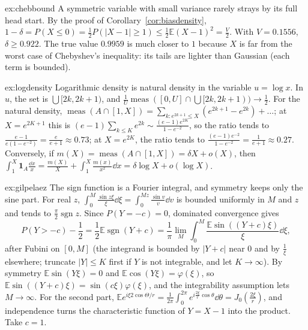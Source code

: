 \begin{solution}{ex:chebbound}
\idea A symmetric variable with small variance rarely strays by its full head start.
\writeup By the proof of Corollary~\ref{cor:biasdensity}, $1-\delta=P(X\le0)=\frac12P(|X-1|\ge1)\le\frac12\mathbb E(X-1)^2=\frac V2$. With $V=0.1556$, $\delta\ge0.922$. The true value $0.9959$ is much closer to $1$ because $X$ is far from the worst case of Chebyshev's inequality: its tails are lighter than Gaussian (each term is bounded).
\end{solution}

\begin{solution}{ex:logdensity}
\idea Logarithmic density is natural density in the variable $u=\log x$.
\writeup In $u$, the set is $\bigcup[2k,2k+1)$, and $\frac1U\operatorname{meas}([0,U]\cap\bigcup[2k,2k+1))\to\frac12$. For the natural density, $\operatorname{meas}(A\cap[1,X])=\sum_{k:e^{2k+1}\le X}(e^{2k+1}-e^{2k})+\dots$; at $X=e^{2K+1}$ this is $(e-1)\sum_{k\le K}e^{2k}\sim\frac{(e-1)e^{2K}}{1-e^{-2}}$, so the ratio tends to $\frac{e-1}{e(1-e^{-2})}=\frac e{e+1}\approx0.73$; at $X=e^{2K}$, the ratio tends to $\frac{(e-1)e^{-2}}{1-e^{-2}}=\frac1{e+1}\approx0.27$. Conversely, if $m(X)=\operatorname{meas}(A\cap[1,X])=\delta X+o(X)$, then $\int_1^X\mathbf 1_A\frac{\dd x}x=\frac{m(X)}X+\int_1^X\frac{m(x)}{x^2}\dd x=\delta\log X+o(\log X)$.
\end{solution}

\begin{solution}{ex:gilpelaez}
\idea The sign function is a Fourier integral, and symmetry keeps only the sine part.
\writeup For real $z$, $\int_0^M\frac{\sin z\xi}\xi\dd\xi=\int_0^{Mz}\frac{\sin v}v\dd v$ is bounded uniformly in $M$ and $z$ and tends to $\frac\pi2\operatorname{sgn}z$. Since $P(Y=-c)=0$, dominated convergence gives
\[
P(Y>-c)-\frac12=\frac12\mathbb E\operatorname{sgn}(Y+c)=\frac1\pi\lim_M\int_0^M\frac{\mathbb E\sin((Y+c)\xi)}\xi\dd\xi,
\]
after Fubini on $[0,M]$ (the integrand is bounded by $|Y+c|$ near $0$ and by $\frac1\xi$ elsewhere; truncate $|Y|\le K$ first if $Y$ is not integrable, and let $K\to\infty$). By symmetry $\mathbb E\sin(Y\xi)=0$ and $\mathbb E\cos(Y\xi)=\varphi(\xi)$, so $\mathbb E\sin((Y+c)\xi)=\sin(c\xi)\varphi(\xi)$, and the integrability assumption lets $M\to\infty$. For the second part, $\mathbb Ee^{i\xi2\cos\Theta/r}=\frac1{2\pi}\int_0^{2\pi}e^{i\frac{2\xi}r\cos\theta}\dd\theta=J_0(\frac{2\xi}r)$, and independence turns the characteristic function of $Y=X-1$ into the product. Take $c=1$.
\end{solution}

